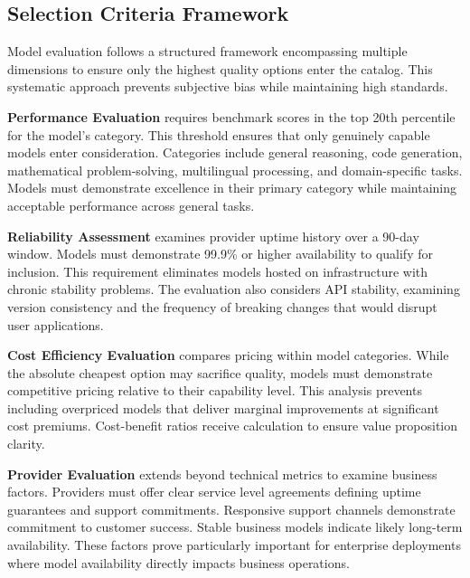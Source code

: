 \documentclass[12pt,a4paper,twoside]{report}
\begin{document}
\subsection{Selection Criteria Framework}

Model evaluation follows a structured framework encompassing multiple dimensions to ensure only the highest quality options enter the catalog. This systematic approach prevents subjective bias while maintaining high standards.

\textbf{Performance Evaluation} requires benchmark scores in the top 20th percentile for the model's category. This threshold ensures that only genuinely capable models enter consideration. Categories include general reasoning, code generation, mathematical problem-solving, multilingual processing, and domain-specific tasks. Models must demonstrate excellence in their primary category while maintaining acceptable performance across general tasks.

\textbf{Reliability Assessment} examines provider uptime history over a 90-day window. Models must demonstrate 99.9\% or higher availability to qualify for inclusion. This requirement eliminates models hosted on infrastructure with chronic stability problems. The evaluation also considers API stability, examining version consistency and the frequency of breaking changes that would disrupt user applications.

\textbf{Cost Efficiency Evaluation} compares pricing within model categories. While the absolute cheapest option may sacrifice quality, models must demonstrate competitive pricing relative to their capability level. This analysis prevents including overpriced models that deliver marginal improvements at significant cost premiums. Cost-benefit ratios receive calculation to ensure value proposition clarity.

\textbf{Provider Evaluation} extends beyond technical metrics to examine business factors. Providers must offer clear service level agreements defining uptime guarantees and support commitments. Responsive support channels demonstrate commitment to customer success. Stable business models indicate likely long-term availability. These factors prove particularly important for enterprise deployments where model availability directly impacts business operations.
\end{document}
